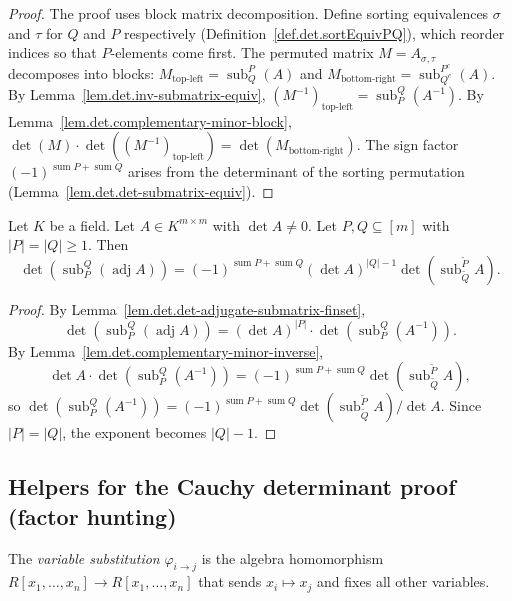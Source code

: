 \begin{proof}
The proof uses block matrix decomposition. Define sorting equivalences
$\sigma$ and $\tau$ for $Q$ and $P$ respectively
(Definition~\ref{def.det.sortEquivPQ}), which reorder indices so that
$P$-elements come first. The permuted matrix $M = A_{\sigma, \tau}$
decomposes into blocks: $M_{\text{top-left}} = \operatorname{sub}_Q^P(A)$
and $M_{\text{bottom-right}} = \operatorname{sub}_{Q^c}^{P^c}(A)$.
By Lemma~\ref{lem.det.inv-submatrix-equiv},
$(M^{-1})_{\text{top-left}} = \operatorname{sub}_P^Q(A^{-1})$.
By Lemma~\ref{lem.det.complementary-minor-block},
$\det(M) \cdot \det((M^{-1})_{\text{top-left}}) = \det(M_{\text{bottom-right}})$.
The sign factor $(-1)^{\operatorname{sum} P + \operatorname{sum} Q}$
arises from the determinant of the sorting permutation
(Lemma~\ref{lem.det.det-submatrix-equiv}).
\end{proof}

\begin{lemma}
\label{lem.det.jacobi-field}
\leanhelper
\leanok
Let $K$ be a field. Let $A \in K^{m \times m}$ with $\det A \neq 0$.
Let $P, Q \subseteq [m]$ with $|P| = |Q| \geq 1$. Then
\[
  \det(\operatorname{sub}_P^Q(\operatorname{adj} A))
  = (-1)^{\operatorname{sum} P + \operatorname{sum} Q}
    (\det A)^{|Q|-1}
    \det(\operatorname{sub}_{\widetilde{Q}}^{\widetilde{P}} A).
\]
\end{lemma}

\begin{proof}
By Lemma~\ref{lem.det.det-adjugate-submatrix-finset},
\[
  \det(\operatorname{sub}_P^Q(\operatorname{adj} A))
  = (\det A)^{|P|} \cdot \det(\operatorname{sub}_P^Q(A^{-1})).
\]
By Lemma~\ref{lem.det.complementary-minor-inverse},
\[
  \det A \cdot \det(\operatorname{sub}_P^Q(A^{-1}))
  = (-1)^{\operatorname{sum} P + \operatorname{sum} Q}
    \det(\operatorname{sub}_{\widetilde{Q}}^{\widetilde{P}} A),
\]
so $\det(\operatorname{sub}_P^Q(A^{-1})) = (-1)^{\operatorname{sum} P + \operatorname{sum} Q}
\det(\operatorname{sub}_{\widetilde{Q}}^{\widetilde{P}} A) / \det A$.
Since $|P| = |Q|$, the exponent becomes $|Q| - 1$.
\end{proof}

\subsection{Helpers for the Cauchy determinant proof (factor hunting)}

\begin{definition}
\label{def.det.substXiToXj}
\leanhelper
\leanok
The \emph{variable substitution} $\varphi_{i \to j}$ is the
algebra homomorphism
$R[x_1, \ldots, x_n] \to R[x_1, \ldots, x_n]$ that sends $x_i \mapsto x_j$
and fixes all other variables.
\end{definition}

